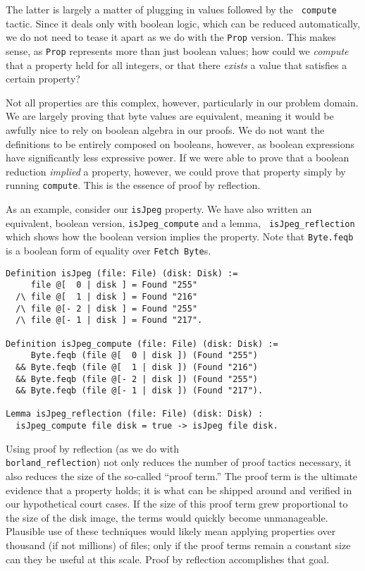 \documentclass[nocopyrightspace]{sigplanconf}
\begin{document}
The latter is largely a matter of plugging in values followed by the {\tt
compute} tactic. Since it deals only with boolean logic, which can be reduced
automatically, we do not need to tease it apart as we do with the {\tt Prop}
version. This makes sense, as {\tt Prop} represents more than just boolean
values; how could we {\em compute} that a property held for all integers, or
that there {\em exists} a value that satisfies a certain property?

Not all properties are this complex, however, particularly in our problem
domain. We are largely proving that byte values are equivalent, meaning it
would be awfully nice to rely on boolean algebra in our proofs. We do not want
the definitions to be entirely composed on booleans, however, as boolean
expressions have significantly less expressive power. If we were able to prove
that a boolean reduction {\em implied} a property, however, we could prove
that property simply by running {\tt compute}. This is the essence of proof by
reflection. 

As an example, consider our {\tt isJpeg} property. We have also written an
equivalent, boolean version, {\tt isJpeg\_compute} and a lemma, {\tt
isJpeg\_reflection} which shows how the boolean version implies the property.
Note that {\tt Byte.feqb} is a boolean form of equality over {\tt Fetch
Byte}s.

\begin{lstlisting}
Definition isJpeg (file: File) (disk: Disk) :=
     file @[  0 | disk ] = Found "255"
  /\ file @[  1 | disk ] = Found "216"
  /\ file @[- 2 | disk ] = Found "255"
  /\ file @[- 1 | disk ] = Found "217".

Definition isJpeg_compute (file: File) (disk: Disk) :=
     Byte.feqb (file @[  0 | disk ]) (Found "255")
  && Byte.feqb (file @[  1 | disk ]) (Found "216")
  && Byte.feqb (file @[- 2 | disk ]) (Found "255")
  && Byte.feqb (file @[- 1 | disk ]) (Found "217").

Lemma isJpeg_reflection (file: File) (disk: Disk) :
  isJpeg_compute file disk = true -> isJpeg file disk.
\end{lstlisting}

Using proof by reflection (as we do with \\{\tt borland\_reflection}) not only
reduces the number of proof tactics necessary, it also reduces the size of the
so-called ``proof term.'' The proof term is the ultimate evidence that a
property holds; it is what can be shipped around and verified in our
hypothetical court cases. If the size of this proof term grew proportional to
the size of the disk image, the terms would quickly become unmanageable. Plausible use of these techniques would likely mean applying properties over
thousand (if not millions) of files; only if the proof terms remain a constant
size can they be useful at this scale. Proof by reflection accomplishes that
goal.
\end{document}
